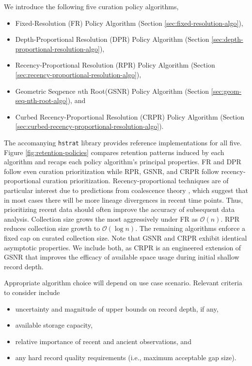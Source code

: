 We introduce the following five curation policy algorithms,
\begin{itemize}
\item Fixed-Resolution (FR) Policy Algorithm (Section \ref{sec:fixed-resolution-algo}),
\item Depth-Proportional Resolution (DPR) Policy Algorithm (Section \ref{sec:depth-proportional-resolution-algo}),
\item Recency-Proportional Resolution (RPR) Policy Algorithm (Section \ref{sec:recency-proportional-resolution-algo}),
\item Geometric Seqpence $n$th Root(GSNR) Policy Algorithm (Section \ref{sec:geom-seq-nth-root-algo}), and
\item Curbed Recency-Proportional Resolution (CRPR) Policy Algorithm (Section \ref{sec:curbed-recency-proportional-resolution-algo}).
\end{itemize}
The accomanying \texttt{hstrat} library provides reference implementations for all five.
Figure \ref{fig:retention-policies} compares retention patterns induced by each algorithm and recaps each policy algorithm's principal properties.
FR and DPR follow even curation prioritization while RPR, GSNR, and CRPR follow recency-proportional curation prioritization.
Recency-proportional techniques are of particular interest due to predictions from coalescence theory \citep{nordborg2019coalescent, berestycki2009recent}, which suggest that in most cases there will be more lineage divergences in recent time points.
Thus, prioritizing recent data should often improve the accuracy of subsequent data analysis.
Collection size grows the most aggressively under FR as $\mathcal{O}(n)$.
RPR reduces collection size growth to $\mathcal{O}(\log n)$.
The remaining algorithms enforce a fixed cap on curated collection size.
Note that GSNR and CRPR exhibit identical asymptotic properties.
We include both, as CRPR is an engineered extension of GSNR that improves the efficacy of available space usage during initial shallow record depth.

Appropriate algorithm choice will depend on use case scenario.
Relevant criteria to consider include
\begin{itemize}
  \item uncertainty and magnitude of upper bounds on record depth, if any,
  \item available storage capacity,
  \item relative importance of recent and ancient observations, and
  \item any hard record quality requirements (i.e., maximum acceptable gap size).
\end{itemize}

